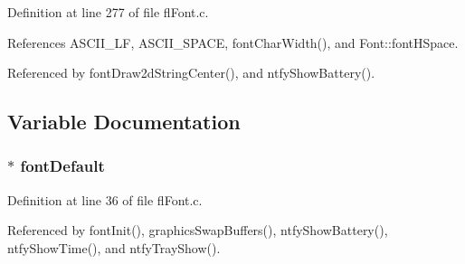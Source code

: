 Definition at line 277 of file fl\-Font.c.

References ASCII\_\-LF, ASCII\_\-SPACE, font\-Char\-Width(), and Font::font\-HSpace.

Referenced by font\-Draw2d\-String\-Center(), and ntfy\-Show\-Battery().

\subsection{Variable Documentation}
\subsubsection{$\ast$ {\bf font\-Default}}\label{flFont_8h_b1e771ff1965e62f65eab80b2ca4475f}




Definition at line 36 of file fl\-Font.c.

Referenced by font\-Init(), graphics\-Swap\-Buffers(), ntfy\-Show\-Battery(), ntfy\-Show\-Time(), and ntfy\-Tray\-Show().